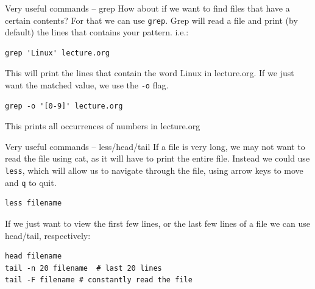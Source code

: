 \documentclass[10pt]{beamer}
\begin{document}
\begin{frame}[label={sec:orga4e4f74},fragile]{Very useful commands -- grep}
 How about if we want to find files that have a certain contents? For that we can
use \texttt{grep}. Grep will read a file and print (by default) the lines that contains
your pattern. i.e.:

\begin{verbatim}
grep 'Linux' lecture.org
\end{verbatim}

This will print the lines that contain the word Linux in lecture.org. If we just
want the matched value, we use the \texttt{-o} flag.

\begin{verbatim}
grep -o '[0-9]' lecture.org
\end{verbatim}

This prints all occurrences of numbers in lecture.org
\end{frame}

\begin{frame}[label={sec:orgf949938},fragile]{Very useful commands -- less/head/tail}
 If a file is very long, we may not want to read the file using cat, as it will
have to print the entire file. Instead we could use \texttt{less}, which will allow us to
navigate through the file, using arrow keys to move and \texttt{q} to quit.

\begin{verbatim}
less filename
\end{verbatim}

If we just want to view the first few lines, or the last few lines of a file we
can use head/tail, respectively:

\begin{verbatim}
head filename
tail -n 20 filename  # last 20 lines
tail -F filename # constantly read the file
\end{verbatim}
\end{frame}
\end{document}
